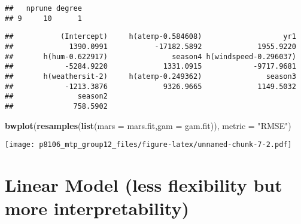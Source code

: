 \documentclass[]{article}
\newenvironment{Shaded}{\begin{snugshade}}{\end{snugshade}}
\newcommand{\KeywordTok}[1]{\textcolor[rgb]{0.13,0.29,0.53}{\textbf{#1}}}
\newcommand{\DataTypeTok}[1]{\textcolor[rgb]{0.13,0.29,0.53}{#1}}
\newcommand{\DecValTok}[1]{\textcolor[rgb]{0.00,0.00,0.81}{#1}}
\newcommand{\StringTok}[1]{\textcolor[rgb]{0.31,0.60,0.02}{#1}}
\newcommand{\OperatorTok}[1]{\textcolor[rgb]{0.81,0.36,0.00}{\textbf{#1}}}
\newcommand{\NormalTok}[1]{#1}
\begin{document}
\begin{verbatim}
##   nprune degree
## 9     10      1
\end{verbatim}

\begin{Shaded}
\end{Shaded}

\begin{verbatim}
##           (Intercept)     h(atemp-0.584608)                   yr1 
##             1390.0991           -17182.5892             1955.9220 
##       h(hum-0.622917)               season4 h(windspeed-0.296037) 
##            -5284.9220             1331.0915            -9717.9681 
##       h(weathersit-2)     h(atemp-0.249362)               season3 
##            -1213.3876             9326.9665             1149.5032 
##               season2 
##              758.5902
\end{verbatim}

\begin{Shaded}
\begin{Highlighting}[]
\KeywordTok{bwplot}\NormalTok{(}\KeywordTok{resamples}\NormalTok{(}\KeywordTok{list}\NormalTok{(}\DataTypeTok{mars =}\NormalTok{ mars.fit,}\DataTypeTok{gam =}\NormalTok{ gam.fit)), }\DataTypeTok{metric =} \StringTok{"RMSE"}\NormalTok{)}
\end{Highlighting}
\end{Shaded}

\texttt{[image: p8106\_mtp\_group12\_files/figure-latex/unnamed-chunk-7-2.pdf]}

\section{Linear Model (less flexibility but more
interpretability)}\label{linear-model-less-flexibility-but-more-interpretability}

\begin{Shaded}
\end{Shaded}
\end{document}
